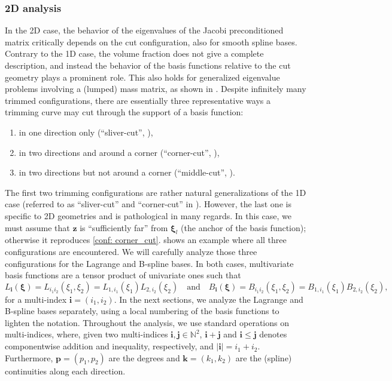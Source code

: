 \documentclass{article}
\numberwithin{equation}{section}
\theoremstyle{definition}
\begin{document}
\subsubsection{2D analysis}
\label{se: 2D_analysis}
In the 2D case, the behavior of the eigenvalues of the Jacobi preconditioned matrix critically depends on the cut configuration, also for smooth spline bases. Contrary to the 1D case, the volume fraction does not give a complete description, and instead the behavior of the basis functions relative to the cut geometry plays a prominent role. This also holds for generalized eigenvalue problems involving a (lumped) mass matrix, as shown in \cite{bioli2025theoretical}. Despite infinitely many trimmed configurations, there are essentially three representative ways a trimming curve may cut through the support of a basis function: 
\begin{enumerate}[noitemsep,label=Configuration (\alph*):,ref=Configuration (\alph*),leftmargin=*]
    \item in one direction only (``sliver-cut'', ), \label{conf: sliver_cut}
    \item in two directions and around a corner (``corner-cut'', ), \label{conf: corner_cut}
    \item in two directions but not around a corner (``middle-cut'', ). \label{conf: middle_cut}
\end{enumerate}
The first two trimming configurations are rather natural generalizations of the 1D case (referred to as ``sliver-cut'' and ``corner-cut'' in \cite{stoter2023critical}). However, the last one is specific to 2D geometries and is pathological in many regards. In this case, we must assume that $\bm{z}$ is ``sufficiently far'' from $\bm{\xi}_{l}$ (the anchor of the basis function); otherwise it reproduces \ref{conf: corner_cut}.  shows an example where all three configurations are encountered. We will carefully analyze those three configurations for the Lagrange and B-spline bases. In both cases, multivariate basis functions are a tensor product of univariate ones such that
\begin{equation*}
    L_{\bm{i}}(\bm{\xi})=L_{i_1i_2}(\xi_1,\xi_2) = L_{1,i_1}(\xi_1)L_{2,i_2}(\xi_2) \quad \text{and} \quad B_{\bm{i}}(\bm{\xi})=B_{i_1i_2}(\xi_1,\xi_2) = B_{1,i_1}(\xi_1)B_{2,i_2}(\xi_2),
\end{equation*}
for a multi-index $\bm{i}=(i_1,i_2)$. In the next sections, we analyze the Lagrange and B-spline bases separately, using a local numbering of the basis functions to lighten the notation. Throughout the analysis, we use standard operations on multi-indices, where, given two multi-indices $\bm{i},\bm{j} \in \mathbb{N}^2$, $\bm{i}+\bm{j}$ and $\bm{i} \leq \bm{j}$ denotes componentwise addition and inequality, respectively, and $|\bm{i}|=i_1+i_2$. Furthermore, $\bm{p}=(p_1,p_2)$ are the degrees and $\bm{k}=(k_1,k_2)$ are the (spline) continuities along each direction.
\end{document}
